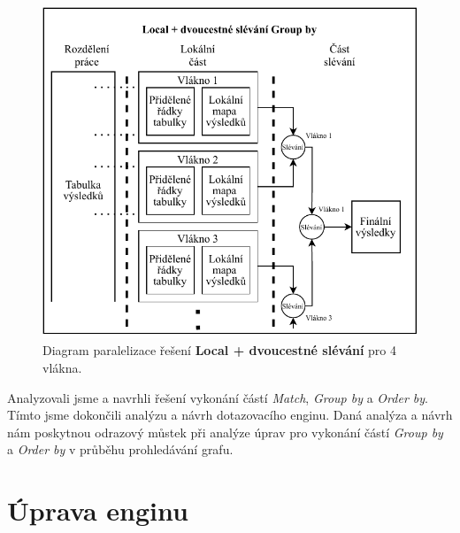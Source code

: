 \clearpage
\begin{figure}[!htp]
\includegraphics{../img/diaLocalGr.pdf}\centering
\caption{Diagram paralelizace řešení \textbf{Local + dvoucestné slévání} pro 4 vlákna.}
\label{figure.diaLocalGr}
\end{figure}

\bigskip
Analyzovali jsme a navrhli řešení vykonání částí \textit{Match}, \textit{Group by} a \textit{Order by}.
Tímto jsme dokončili analýzu a návrh dotazovacího enginu.
Daná analýza a návrh nám poskytnou odrazový můstek při analýze úprav pro vykonání částí \textit{Group by} a \textit{Order by} v průběhu prohledávání grafu.


\section{Úprava enginu} \label{anal.improvement}

